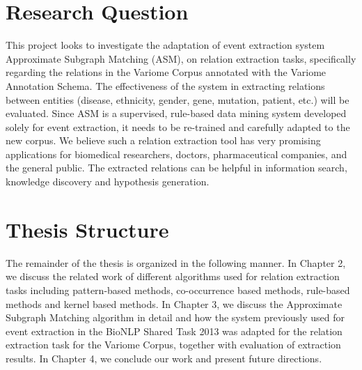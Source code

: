 \section{Research Question}\label{section1.3} %
This project looks to investigate the adaptation of event extraction system Approximate Subgraph Matching (ASM)\cite{liu2013approximate},  on relation extraction tasks, specifically regarding the relations in the Variome Corpus annotated with the Variome Annotation Schema\cite{verspoor2013annotating}. The effectiveness of the system in extracting relations between entities (disease, ethnicity, gender, gene, mutation, patient, etc.) will be evaluated. Since ASM is a supervised, rule-based data mining system developed solely for event extraction, it needs to be re-trained and carefully adapted to the new corpus. We believe such a relation extraction tool has very promising applications for biomedical researchers, doctors, pharmaceutical companies, and the general public. The extracted relations can be helpful in information search, knowledge discovery and hypothesis generation. 
\section{Thesis Structure}
The remainder of the thesis is organized in the following manner. In Chapter 2, we discuss the related work of different algorithms used for relation extraction tasks including pattern-based methods, co-occurrence based methods, rule-based methods and kernel based methods. In Chapter 3, we discuss the Approximate Subgraph Matching algorithm in detail and how the system previously used for event extraction in the BioNLP Shared Task 2013 was adapted for the relation extraction task for the Variome Corpus, together with evaluation of extraction results. In Chapter 4, we conclude our work and present future directions.

